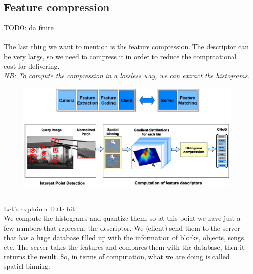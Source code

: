 \subsection{Feature compression}
TODO: da finire\\\\
The last thing we want to mention is the feature compression. The descriptor can be very large, so we need to compress it in order to reduce the computational cost for delivering.
\\\textit{NB: To compute the compression in a lossless way, we can extract the histograms.}
\begin{figure}[h]
    \centering
    \includegraphics[scale=0.5]{Figures/FeatureCompression.png}
\end{figure}
\\Let's explain a little bit.
\\We compute the histograms and quantize them, so at this point we have just a few numbers that represent the descriptor. 
We (client) send them to the server that has a huge database filled up with the information of blocks, objects, songs, etc.
The server takes the features and compares them with the database, then it returns the result.
So, in terms of computation, what we are doing is called spatial binning.
